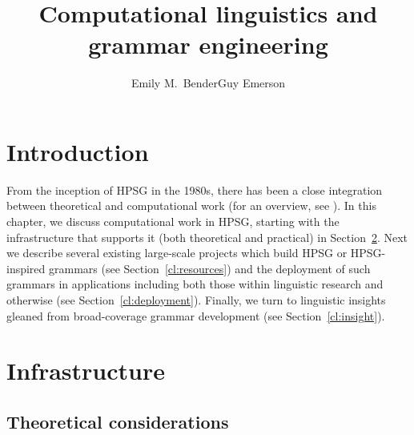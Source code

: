 \documentclass[output=paper,biblatex,babelshorthands,newtxmath,draftmode,colorlinks,citecolor=brown]{langscibook}
\author{Emily M.\ Bender\affiliation{University of Washington}\lastand Guy Emerson\affiliation{University of Cambridge}}
\title{Computational linguistics and grammar engineering}
\begin{document}
\maketitle

\label{chap-cl}

\section{Introduction}

From the inception of HPSG in the 1980s, there has been a close integration between theoretical and
computational work (for an overview, see ).  In this chapter, we
discuss computational work in HPSG, starting with the infrastructure that supports it (both
theoretical and practical) in Section~\ref{cl:infrastructure}.  Next we describe several existing
large-scale projects which build HPSG or HPSG-inspired grammars (see Section~\ref{cl:resources}) and
the deployment of such grammars in applications including both those within linguistic research and
otherwise (see Section~\ref{cl:deployment}).  Finally, we turn to linguistic insights gleaned from
broad-coverage grammar development (see Section~\ref{cl:insight}).

\section{Infrastructure}
\label{cl:infrastructure}

\subsection{Theoretical considerations}
\label{cl:theoretical}
\end{document}
